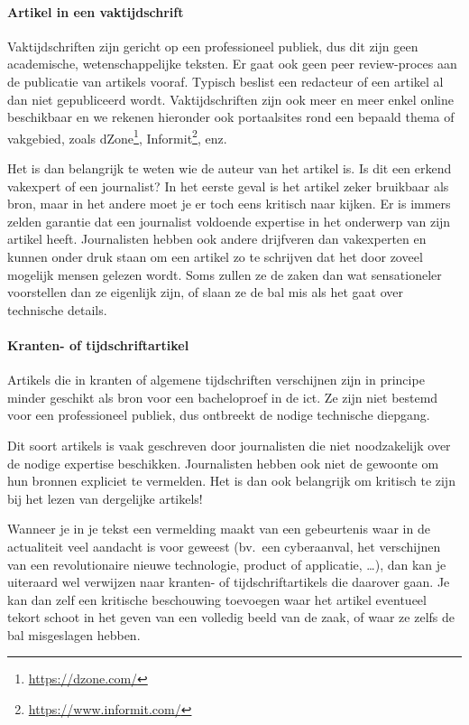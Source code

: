 \paragraph{Artikel in een vaktijdschrift}

Vaktijdschriften zijn gericht op een professioneel publiek, dus dit zijn geen academische, wetenschappelijke teksten. Er gaat ook geen peer review-proces aan de publicatie van artikels vooraf. Typisch beslist een redacteur of een artikel al dan niet gepubliceerd wordt. Vaktijdschriften zijn ook meer en meer enkel online beschikbaar en we rekenen hieronder ook portaalsites rond een bepaald thema of vakgebied, zoals dZone\footnote{\url{https://dzone.com/}}, Informit\footnote{\url{https://www.informit.com/}}, enz.

Het is dan belangrijk te weten wie de auteur van het artikel is. Is dit een erkend vakexpert of een journalist? In het eerste geval is het artikel zeker bruikbaar als bron, maar in het andere moet je er toch eens kritisch naar kijken. Er is immers zelden garantie dat een journalist voldoende expertise in het onderwerp van zijn artikel heeft. Journalisten hebben ook andere drijfveren dan vakexperten en kunnen onder druk staan om een artikel zo te schrijven dat het door zoveel mogelijk mensen gelezen wordt. Soms zullen ze de zaken dan wat sensationeler voorstellen dan ze eigenlijk zijn, of slaan ze de bal mis als het gaat over technische details.

\paragraph{Kranten- of tijdschriftartikel}

Artikels die in kranten of algemene tijdschriften verschijnen zijn in principe minder geschikt als bron voor een bacheloproef in de ict. Ze zijn niet bestemd voor een professioneel publiek, dus ontbreekt de nodige technische diepgang. 

Dit soort artikels is vaak geschreven door journalisten die niet noodzakelijk over de nodige expertise beschikken. Journalisten hebben ook niet de gewoonte om hun bronnen expliciet te vermelden. Het is dan ook belangrijk om kritisch te zijn bij het lezen van dergelijke artikels!

Wanneer je in je tekst een vermelding maakt van een gebeurtenis waar in de actualiteit veel aandacht is voor geweest (bv.\ een cyberaanval, het verschijnen van een revolutionaire nieuwe technologie, product of applicatie, \ldots), dan kan je uiteraard wel verwijzen naar kranten- of tijdschriftartikels die daarover gaan. Je kan dan zelf een kritische beschouwing toevoegen waar het artikel eventueel tekort schoot in het geven van een volledig beeld van de zaak, of waar ze zelfs de bal misgeslagen hebben.


